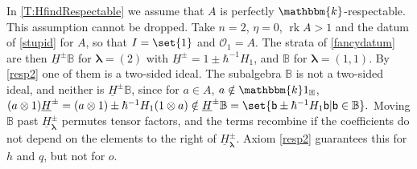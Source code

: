\documentclass[a4paper,11pt]{amsart}
\newcommand\blam{{\boldsymbol\lambda}}
\numberwithin{equation}{subsection}
\theoremstyle{definition}
\theoremstyle{theorem}
\theoremstyle{remark}
\newcommand\CO{\mathcal{O}}
\newcommand\Olam[1][\lambda]{\CO_{#1}}
\newcommand\HH{\mathbb{H}}
\newcommand\HJpm{\underline{H}^\pm}
\newcommand\bb{\mathsf{b}}
\newcommand\op{\operatorname}
\newcommand\kk{\mathbbm{k}}
\newcommand{\Bo}{\mathbb{B}}
\begin{document}
\begin{Remark}\label{Rk:Respectable}
  In   \autoref{T:HfindRespectable} we assume that $A$ is perfectly $\kk$-respectable. This assumption cannot be dropped.
  Take $n=2$, $\eta=0$, $\op{rk} A>1$ and the datum of \autoref{stupid}
  for $A$, so that $I=\set{1}$ and $\Olam[1]=A$. The strata of \autoref{fancydatum} are then
  $\HJpm\Bo$ for $\blam=(2)$ with $\HJpm=1\pm\hbar^{-1}H_1$, and $\Bo$ for $\blam=(1,1)$. By
  \autoref{resp2} one of them is a two-sided ideal. The subalgebra $\Bo$
  is not a two-sided ideal, and neither is
  $\HJpm\Bo$, since for $a\in A$, $a\notin\kk1_{\HH}$, $(a\otimes1)\HJpm=(a\otimes1)\pm\hbar^{-1}H_1(1\otimes a)
    \notin\HJpm\Bo=\set{\bb\pm\hbar^{-1}H_1\bb|\bb\in\Bo}.$
  Moving $\Bo$ past $\HJpm_\blam$ permutes tensor factors, and the terms recombine
  if the coefficients do not depend on the elements to the right of $\HJpm_\blam$.
  Axiom \autoref{resp2} guarantees this for $h$ and $q$, but not for $o$.
\end{Remark}
\end{document}
